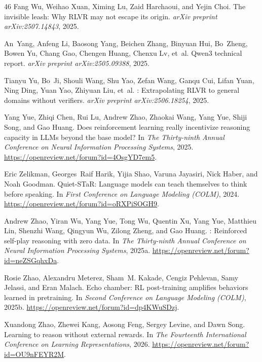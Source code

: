\begin{thebibliography}{46}
Fang Wu, Weihao Xuan, Ximing Lu, Zaid Harchaoui, and Yejin Choi.
\newblock The invisible leash: Why {RLVR} may not escape its origin.
\newblock \emph{arXiv preprint arXiv:2507.14843}, 2025.

An~Yang, Anfeng Li, Baosong Yang, Beichen Zhang, Binyuan Hui, Bo~Zheng, Bowen Yu, Chang Gao, Chengen Huang, Chenxu Lv, et~al.
\newblock Qwen3 technical report.
\newblock \emph{arXiv preprint arXiv:2505.09388}, 2025.

Tianyu Yu, Bo~Ji, Shouli Wang, Shu Yao, Zefan Wang, Ganqu Cui, Lifan Yuan, Ning Ding, Yuan Yao, Zhiyuan Liu, et~al.
: Extrapolating {RLVR} to general domains without verifiers.
\newblock \emph{arXiv preprint arXiv:2506.18254}, 2025.

Yang Yue, Zhiqi Chen, Rui Lu, Andrew Zhao, Zhaokai Wang, Yang Yue, Shiji Song, and Gao Huang.
\newblock Does reinforcement learning really incentivize reasoning capacity in {LLM}s beyond the base model?
\newblock In \emph{The Thirty-ninth Annual Conference on Neural Information Processing Systems}, 2025.
\newblock \url{https://openreview.net/forum?id=4OsgYD7em5}.

Eric Zelikman, Georges~Raif Harik, Yijia Shao, Varuna Jayasiri, Nick Haber, and Noah Goodman.
\newblock Quiet-{ST}a{R}: Language models can teach themselves to think before speaking.
\newblock In \emph{First Conference on Language Modeling (COLM)}, 2024.
\newblock \url{https://openreview.net/forum?id=oRXPiSOGH9}.

Andrew Zhao, Yiran Wu, Yang Yue, Tong Wu, Quentin Xu, Yang Yue, Matthieu Lin, Shenzhi Wang, Qingyun Wu, Zilong Zheng, and Gao Huang.
: Reinforced self-play reasoning with zero data.
\newblock In \emph{The Thirty-ninth Annual Conference on Neural Information Processing Systems}, 2025{a}.
\newblock \url{https://openreview.net/forum?id=neZSGqhxDa}.

Rosie Zhao, Alexandru Meterez, Sham~M. Kakade, Cengiz Pehlevan, Samy Jelassi, and Eran Malach.
\newblock Echo chamber: {RL} post-training amplifies behaviors learned in pretraining.
\newblock In \emph{Second Conference on Language Modeling (COLM)}, 2025{b}.
\newblock \url{https://openreview.net/forum?id=dp4KWuSDzj}.

Xuandong Zhao, Zhewei Kang, Aosong Feng, Sergey Levine, and Dawn Song.
\newblock Learning to reason without external rewards.
\newblock In \emph{The Fourteenth International Conference on Learning Representations}, 2026.
\newblock \url{https://openreview.net/forum?id=OU9nFEYR2M}.


\end{thebibliography}
